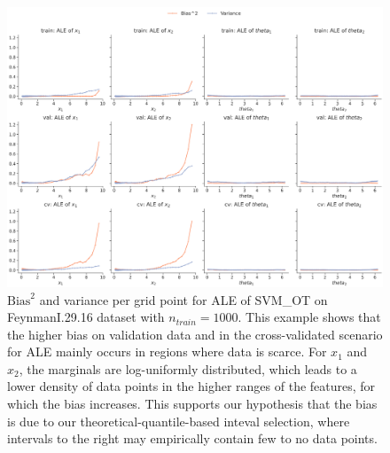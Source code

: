 \documentclass[runningheads]{llncs}
\begin{document}
\begin{figure}
    \centering
    \includegraphics[width=\textwidth]{img/further_investigation/feynman_ale_SVM_OT_1000.png}
    \caption{$\text{Bias}^2$ and variance per grid point for ALE of SVM\_OT on FeynmanI.29.16 dataset with $n_{train} = 1000$.
        This example shows that the higher bias on validation data and in the cross-validated scenario for ALE mainly occurs in regions
        where data is scarce. For $x_1$ and $x_2$, the marginals are log-uniformly distributed, which leads to a lower density of data points
        in the higher ranges of the features, for which the bias increases. This supports our hypothesis that the bias is due to our
        theoretical-quantile-based inteval selection, where intervals to the right may empirically contain few to no data points.}
    \label{fig:further-ale-svm-feynman}  %
\end{figure}
\end{document}
